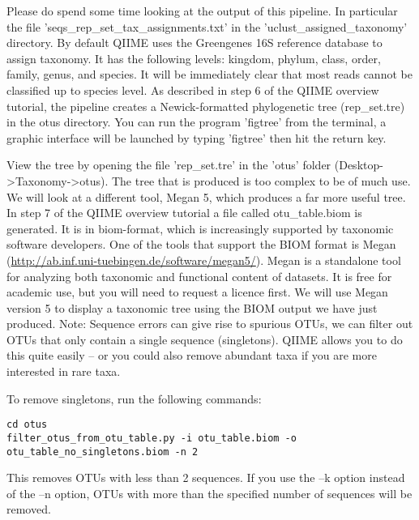 \begin{note}

Please do spend some time looking at the output of this pipeline. In particular the file 'seqs\_rep\_set\_tax\_assignments.txt' in the 'uclust\_assigned\_taxonomy' directory. By default QIIME uses the Greengenes 16S reference database to assign taxonomy. It has the following levels: kingdom, phylum, class, order, family, genus, and species. It will be immediately clear that most reads cannot be classified up to species level.
As described in step 6 of the QIIME overview tutorial, the pipeline creates a Newick-formatted phylogenetic tree (rep\_set.tre) in the otus directory. You can run the program 'figtree' from the terminal, a graphic interface will be launched by typing 'figtree' then hit the return key.

View the tree by opening the file 'rep\_set.tre' in the 'otus' folder (Desktop->Taxonomy->otus). The tree that is produced is too complex to be of much use. We will look at a different tool, Megan 5, which produces a far more useful tree.
In step 7 of the QIIME overview tutorial a file called otu\_table.biom is generated. It is in biom-format, which is increasingly supported by taxonomic software developers. One of the tools that support the BIOM format is Megan (\url{http://ab.inf.uni-tuebingen.de/software/megan5/}). Megan is a standalone tool for analyzing both taxonomic and functional content of datasets. It is free for academic use, but you will need to request a licence first. We will use Megan version 5 to display a taxonomic tree using the BIOM output we have just produced.
Note: Sequence errors can give rise to spurious OTUs, we can filter out OTUs that only contain a single sequence (singletons). QIIME allows you to do this quite easily – or you could also remove abundant taxa if you are more interested in rare taxa.

\end{note}

\begin{steps}
To remove singletons, run the following commands:
\begin{lstlisting}
cd otus
filter_otus_from_otu_table.py -i otu_table.biom -o otu_table_no_singletons.biom -n 2

\end{lstlisting}
\end{steps}

\begin{note}
This removes OTUs with less than 2 sequences. If you use the –k option instead of the –n option, OTUs with more than the specified number of sequences will be removed.
\end{note}

